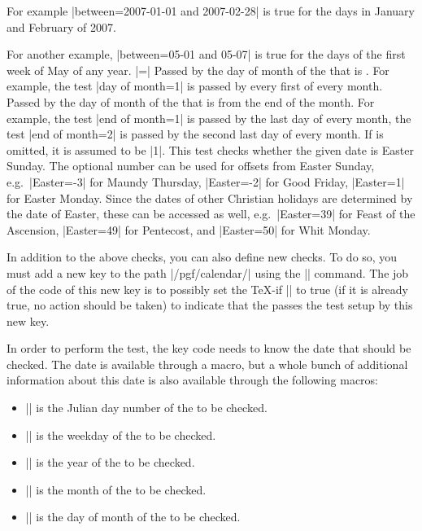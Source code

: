 \begin{command}{\pgfcalendarifdate{}}
\begin{itemize}
            For example |between=2007-01-01 and 2007-02-28| is true for the
            days in January and February of 2007.

            For another example, |between=05-01 and 05-07| is true for the days
            of the first week of May of any year.
        |=| Passed by the day of
            month of the  that is . For example, the
            test |day of month=1| is passed by every first of every month.
         Passed by the
            day of month of the  that is  from the end
            of the month. For example, the test |end of month=1| is passed by
            the last day of every month, the test |end of month=2| is passed by
            the second last day of every month. If  is omitted, it
            is assumed to be |1|.
         This test checks
            whether the given date is Easter Sunday. The optional number can be
            used for offsets from Easter Sunday, e.g.\ |Easter=-3| for Maundy
            Thursday, |Easter=-2| for Good Friday, |Easter=1| for Easter
            Monday. Since the dates of other Christian holidays are determined
            by the date of Easter, these can be accessed as well, e.g.\
            |Easter=39| for Feast of the Ascension, |Easter=49| for Pentecost,
            and |Easter=50| for Whit Monday.
    \end{itemize}

    In addition to the above checks, you can also define new checks. To do so,
    you must add a new key to the path |/pgf/calendar/| using the |\pgfkeys|
    command. The job of the code of this new key is to possibly set the \TeX-if
    |\ifpgfcalendarmatches| to true (if it is already true, no action should be
    taken) to indicate that the \meta{date} passes the test setup by this new
    key.

    In order to perform the test, the key code needs to know the date that
    should be checked. The date is available through a macro, but a whole bunch
    of additional information about this date is also available through the
    following macros:
    \begin{itemize}
        \item |\pgfcalendarifdatejulian| is the Julian day number of the
            \meta{date} to be checked.
        \item |\pgfcalendarifdateweekday| is the weekday of the  to
            be checked.
        \item |\pgfcalendarifdateyear| is the year of the  to be
            checked.
        \item |\pgfcalendarifdatemonth| is the month of the  to be
            checked.
        \item |\pgfcalendarifdateday| is the day of month of the  to
            be checked.
    \end{itemize}


\end{command}
